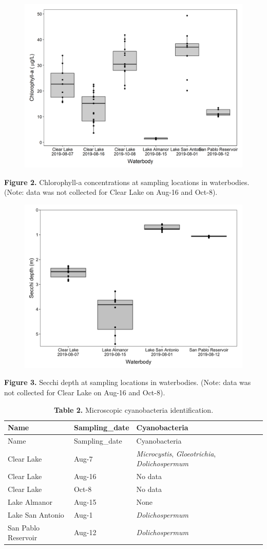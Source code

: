 \documentclass[
]{article}
\begin{document}
\begin{figure}

{\centering \includegraphics[width=0.6\linewidth]{../Data/Figures_output/chla} 

}

\end{figure}

\textbf{Figure 2.} Chlorophyll-a concentrations at sampling locations in
waterbodies. (Note: data was not collected for Clear Lake on Aug-16 and
Oct-8).

\begin{figure}

{\centering \includegraphics[width=0.6\linewidth]{../Data/Figures_output/secchi} 

}

\end{figure}

\textbf{Figure 3.} Secchi depth at sampling locations in waterbodies.
(Note: data was not collected for Clear Lake on Aug-16 and Oct-8).

\begin{longtable}[]{@{}lll@{}}
\caption{\textbf{Table 2.} Microscopic cyanobacteria
identification.}\tabularnewline
\toprule
Name & Sampling\_date & Cyanobacteria\tabularnewline
\midrule
\endfirsthead
\toprule
Name & Sampling\_date & Cyanobacteria\tabularnewline
\midrule
\endhead
Clear Lake & Aug-7 & \emph{Microcystis}, \emph{Gloeotrichia},
\emph{Dolichospermum}\tabularnewline
Clear Lake & Aug-16 & No data\tabularnewline
Clear Lake & Oct-8 & No data\tabularnewline
Lake Almanor & Aug-15 & None\tabularnewline
Lake San Antonio & Aug-1 & \emph{Dolichospermum}\tabularnewline
San Pablo Reservoir & Aug-12 & \emph{Dolichospermum}\tabularnewline
\bottomrule
\end{longtable}
\end{document}

